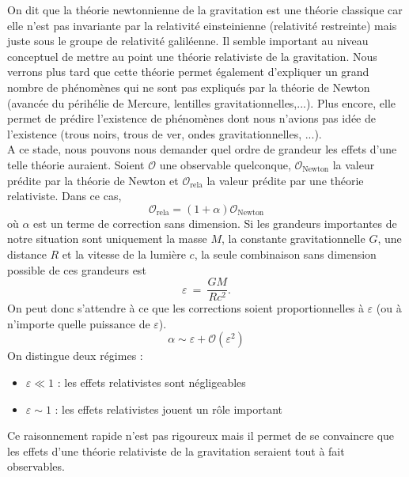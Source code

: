 \documentclass[a4paper,11pt]{report}
\theoremstyle{definition}
\theoremstyle{plain}
\theoremstyle{definition}
\theoremstyle{remark}
\renewcommand{\O}{\mathcal{O}}
\begin{document}
        On dit que la théorie newtonnienne de la gravitation est une théorie classique car elle n'est pas invariante par la relativité einsteinienne (relativité restreinte) mais juste sous le groupe de relativité galiléenne. Il semble important au niveau conceptuel de mettre au point une théorie relativiste de la gravitation. Nous verrons plus tard que cette théorie permet également d'expliquer un grand nombre de phénomènes qui ne sont pas expliqués par la théorie de Newton (avancée du périhélie de Mercure, lentilles gravitationnelles,...). Plus encore, elle permet de prédire l'existence de phénomènes dont nous n'avions pas idée de l'existence (trous noirs, trous de ver, ondes gravitationnelles, ...).\\
        
        A ce stade, nous pouvons nous demander quel ordre de grandeur les effets d'une telle théorie auraient. Soient $\O$ une observable quelconque, $\O_{\text{Newton}}$ la valeur prédite par la théorie de Newton et $\O_{\text{rela}}$ la valeur prédite par une théorie relativiste. Dans ce cas,
        \begin{equation}
            \O_{\text{rela}} = (1+\alpha)\O_{\text{Newton}}
        \end{equation}
        où $\alpha$ est un terme de correction sans dimension. Si les grandeurs importantes de notre situation sont uniquement la masse $M$, la constante gravitationnelle $G$, une distance $R$ et la vitesse de la lumière $c$, la seule combinaison sans dimension possible de ces grandeurs est 
        \begin{equation}
            \varepsilon~\hat{=}~\frac{GM}{Rc^2}.
        \end{equation}
        On peut donc s'attendre à ce que les corrections soient proportionnelles à $\varepsilon$ (ou à n'importe quelle puissance de $\varepsilon$).
        \begin{equation}
            \alpha\sim\varepsilon+\O(\varepsilon^2)
        \end{equation}
        On distingue deux régimes :
        \begin{itemize}[label=\textbullet]
            \item $\varepsilon\ll 1$ : les effets relativistes sont négligeables
            \item $\varepsilon\sim 1$ : les effets relativistes jouent un rôle important
        \end{itemize}
        Ce raisonnement rapide n'est pas rigoureux mais il permet de se convaincre que les effets d'une théorie relativiste de la gravitation seraient tout à fait observables. 
\end{document}
